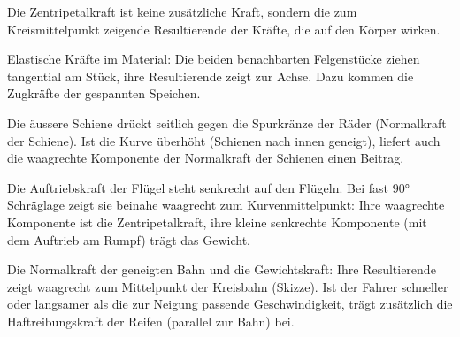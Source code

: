 Die Zentripetalkraft ist keine zusätzliche Kraft, sondern die zum Kreismittelpunkt zeigende Resultierende der Kräfte, die auf den Körper wirken.

\begin{abcliste}
\abc Elastische Kräfte im Material: Die beiden benachbarten Felgenstücke ziehen tangential am Stück, ihre Resultierende zeigt zur Achse. Dazu kommen die Zugkräfte der gespannten Speichen.

\abc Die äussere Schiene drückt seitlich gegen die Spurkränze der Räder (Normalkraft der Schiene). Ist die Kurve überhöht (Schienen nach innen geneigt), liefert auch die waagrechte Komponente der Normalkraft der Schienen einen Beitrag.

\abc Die Auftriebskraft der Flügel steht senkrecht auf den Flügeln. Bei fast \ang{90} Schräglage zeigt sie beinahe waagrecht zum Kurvenmittelpunkt: Ihre waagrechte Komponente ist die Zentripetalkraft, ihre kleine senkrechte Komponente (mit dem Auftrieb am Rumpf) trägt das Gewicht.

\abc Die Normalkraft der geneigten Bahn und die Gewichtskraft: Ihre Resultierende zeigt waagrecht zum Mittelpunkt der Kreisbahn (Skizze). Ist der Fahrer schneller oder langsamer als die zur Neigung passende Geschwindigkeit, trägt zusätzlich die Haftreibungskraft der Reifen (parallel zur Bahn) bei.
\end{abcliste}

\begin{center}
\end{center}
